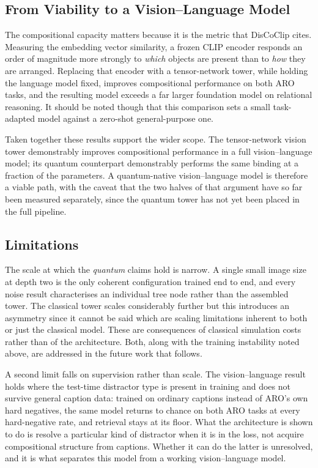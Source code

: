\documentclass[12pt, a4paper, oneside]{report}
\begin{document}
\subsection{From Viability to a Vision--Language Model}

The compositional capacity matters because it is the metric that DisCoClip cites. Measuring the embedding vector similarity, a frozen CLIP encoder responds an order of magnitude more strongly to \textit{which} objects are present than to \textit{how} they are arranged. Replacing that encoder with a tensor-network tower, while holding the language model fixed, improves compositional performance on both ARO tasks, and the resulting model exceeds a far larger foundation model on relational reasoning. It should be noted though that this comparison sets a small task-adapted model against a zero-shot general-purpose one.

Taken together these results support the wider scope. The tensor-network vision tower demonstrably improves compositional performance in a full vision--language model; its quantum counterpart demonstrably performs the same binding at a fraction of the parameters. A quantum-native vision--language model is therefore a viable path, with the caveat that the two halves of that argument have so far been measured separately, since the quantum tower has not yet been placed in the full pipeline.

\subsection{Limitations}

The scale at which the \emph{quantum} claims hold is narrow. A single small image size at depth two is the only coherent configuration trained end to end, and every noise result characterises an individual tree node rather than the assembled tower. The classical tower scales considerably further but this introduces an asymmetry since it cannot be said which are scaling limitations inherent to both or just the classical model. These are consequences of classical simulation costs rather than of the architecture. Both, along with the training instability noted above, are addressed in the future work that follows.

A second limit falls on supervision rather than scale. The vision--language result holds where the test-time distractor type is present in training and does not survive general caption data: trained on ordinary captions instead of ARO's own hard negatives, the same model returns to chance on both ARO tasks at every hard-negative rate, and retrieval stays at its floor. What the architecture is shown to do is resolve a particular kind of distractor when it is in the loss, not acquire compositional structure from captions. Whether it can do the latter is unresolved, and it is what separates this model from a working vision--language model.
\end{document}
